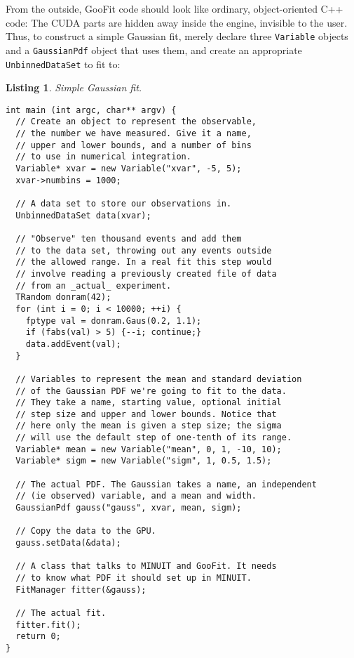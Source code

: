 \documentclass[12pt,pdflatex]{article}
\newtheorem{listing}{Listing}
\begin{document}
From the outside, GooFit code should look like ordinary,
object-oriented C++ code: The CUDA parts are hidden away
inside the engine, invisible to the user. Thus, to construct
a simple Gaussian fit, merely declare three \texttt{Variable}
objects and a \texttt{GaussianPdf} object that uses them,
and create an appropriate \texttt{UnbinnedDataSet} to fit to:
\begin{listing}
\label{listing:gaussfit}
Simple Gaussian fit.

\begin{verbatim}
int main (int argc, char** argv) {
  // Create an object to represent the observable, 
  // the number we have measured. Give it a name,
  // upper and lower bounds, and a number of bins
  // to use in numerical integration. 
  Variable* xvar = new Variable("xvar", -5, 5); 
  xvar->numbins = 1000; 

  // A data set to store our observations in.
  UnbinnedDataSet data(xvar);

  // "Observe" ten thousand events and add them
  // to the data set, throwing out any events outside
  // the allowed range. In a real fit this step would
  // involve reading a previously created file of data
  // from an _actual_ experiment. 
  TRandom donram(42); 
  for (int i = 0; i < 10000; ++i) {
    fptype val = donram.Gaus(0.2, 1.1);
    if (fabs(val) > 5) {--i; continue;} 
    data.addEvent(val); 
  }

  // Variables to represent the mean and standard deviation
  // of the Gaussian PDF we're going to fit to the data.
  // They take a name, starting value, optional initial 
  // step size and upper and lower bounds. Notice that
  // here only the mean is given a step size; the sigma
  // will use the default step of one-tenth of its range.
  Variable* mean = new Variable("mean", 0, 1, -10, 10);
  Variable* sigm = new Variable("sigm", 1, 0.5, 1.5); 

  // The actual PDF. The Gaussian takes a name, an independent
  // (ie observed) variable, and a mean and width. 
  GaussianPdf gauss("gauss", xvar, mean, sigm); 

  // Copy the data to the GPU. 
  gauss.setData(&data);

  // A class that talks to MINUIT and GooFit. It needs
  // to know what PDF it should set up in MINUIT. 
  FitManager fitter(&gauss); 

  // The actual fit. 
  fitter.fit(); 
  return 0;
}
\end{verbatim}
\end{listing} 
\end{document}
